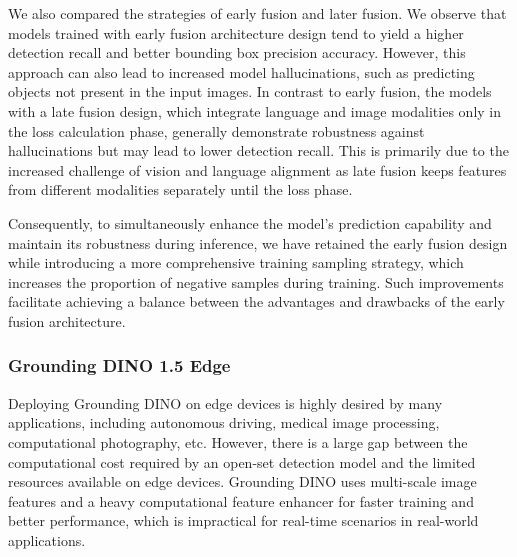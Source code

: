 We also compared the strategies of early fusion and later fusion. We observe that models trained with early fusion architecture design tend to yield a higher detection recall and better bounding box precision accuracy. However, this approach can also lead to increased model hallucinations, such as predicting objects not present in the input images.
In contrast to early fusion, the models with a late fusion design, which integrate language and image modalities only in the loss calculation phase, generally demonstrate robustness against hallucinations but may lead to lower detection recall. This is primarily due to the increased challenge of vision and language alignment as late fusion keeps features from different modalities separately until the loss phase. %

Consequently, to simultaneously enhance the model's prediction capability and maintain its robustness during inference, we have retained the early fusion design while introducing a more comprehensive training sampling strategy, which increases the proportion of negative samples during training. Such improvements facilitate achieving a balance between the advantages and drawbacks of the early fusion architecture.

\subsubsection{Grounding DINO 1.5 Edge}
\label{gd1.5_edge_introduction}

Deploying Grounding DINO on edge devices is highly desired by many applications, including autonomous driving, medical image processing, computational photography, etc. However, there is a large gap between the computational cost required by an open-set detection model and the limited resources available on edge devices. 
Grounding DINO uses multi-scale image features and a heavy computational feature enhancer for faster training and better performance, which is impractical for real-time scenarios in real-world applications.


